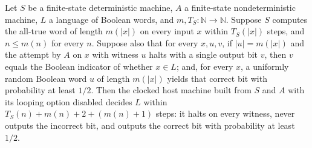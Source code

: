 \begin{theorem}
\label{Randomized.clockHost_abortDecides}
\leanok
{}
Let $S$ be a finite-state deterministic machine, $A$ a finite-state nondeterministic
machine, $L$ a language of Boolean words, and $m,T_S:\mathbb{N}\to\mathbb{N}$. Suppose
$S$ computes the all-true word of length $m(|x|)$ on every input $x$ within $T_S(|x|)$
steps, and $n\le m(n)$ for every $n$. Suppose also that for every $x,u,v$, if
$|u|=m(|x|)$ and the attempt by $A$ on $x$ with witness $u$ halts with a single output
bit $v$, then $v$ equals the Boolean indicator of whether $x\in L$; and, for every $x$,
a uniformly random Boolean word $u$ of length $m(|x|)$ yields that correct bit with
probability at least $1/2$. Then the clocked host machine built from $S$ and $A$ with
its looping option disabled decides $L$ within $T_S(n)+m(n)+2+(m(n)+1)$ steps: it halts
on every witness, never outputs the incorrect bit, and outputs the correct bit with
probability at least $1/2$.
\end{theorem}
